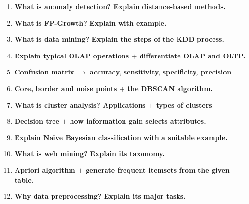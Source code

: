 \begin{enumerate}
  \item \textbf{What is anomaly detection? Explain distance-based methods.}
        \hfill {} 
  \item \textbf{What is FP-Growth? Explain with example.} \hfill {} 
  \item \textbf{What is data mining? Explain the steps of the KDD process.}
        \hfill {} 
  \item \textbf{Explain typical OLAP operations $+$ differentiate OLAP and OLTP.}
        \hfill {} 
  \item \textbf{Confusion matrix $\rightarrow$ accuracy, sensitivity, specificity, precision.}
        \hfill {} 
  \item \textbf{Core, border and noise points $+$ the DBSCAN algorithm.}
        \hfill {} 
  \item \textbf{What is cluster analysis? Applications $+$ types of clusters.}
        \hfill {} 
  \item \textbf{Decision tree $+$ how information gain selects attributes.}
        \hfill {} 
  \item \textbf{Explain Naive Bayesian classification with a suitable example.}
        \hfill {} 
  \item \textbf{What is web mining? Explain its taxonomy.} \hfill {} 
  \item \textbf{Apriori algorithm $+$ generate frequent itemsets from the given table.}
        \hfill {} 
  \item \textbf{Why data preprocessing? Explain its major tasks.}
        \hfill {} 
\end{enumerate}

\begin{center}\end{center}

